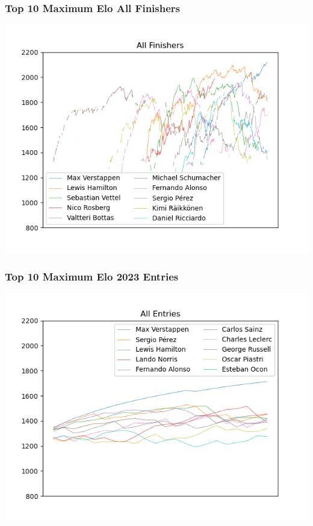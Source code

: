 \documentclass{beamer}
\begin{document}
\begin{frame}
    \frametitle{Top 10 Maximum Elo All Finishers}
    \includegraphics[width=\textwidth]{AllTimeTop10EloFinished.png}
\end{frame}

\begin{frame}
    \frametitle{Top 10 Maximum Elo 2023 Entries}
    \includegraphics[width=\textwidth]{2023Top10EloAll.png}
\end{frame}
\end{document}
